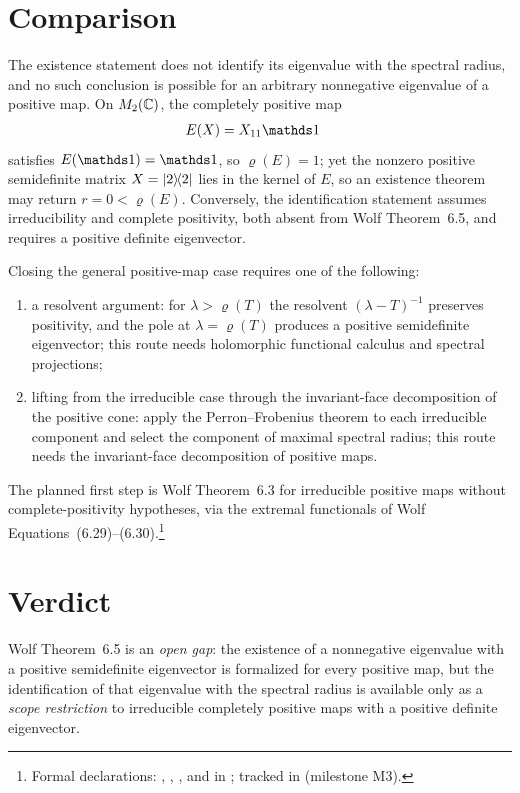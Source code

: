 \documentclass{article}
\begin{document}
\section{Comparison}

The existence statement does not identify its eigenvalue with the spectral
radius, and no such conclusion is possible for an arbitrary nonnegative
eigenvalue of a positive map. On $M_{2}(\mathbb{C})$, the completely positive map
\begin{align}
  E(X)&=X_{11} \one
\end{align}
satisfies $E(\one)=\one$, so $\varrho(E)=1$; yet the nonzero positive
semidefinite matrix $X=|2\rangle\!\langle 2|$ lies in the kernel of $E$, so an
existence theorem may return $r=0<\varrho(E)$. Conversely, the
identification statement assumes irreducibility and complete positivity, both
absent from Wolf Theorem~6.5, and requires a positive definite eigenvector.

Closing the general positive-map case requires one of the following:
\begin{enumerate}
\item a resolvent argument: for $\lambda>\varrho(T)$ the resolvent
  $(\lambda-T)^{-1}$ preserves positivity, and the pole at
  $\lambda=\varrho(T)$ produces a positive semidefinite eigenvector; this
  route needs holomorphic functional calculus and spectral projections;
\item lifting from the irreducible case through the invariant-face
  decomposition of the positive cone: apply the Perron--Frobenius theorem to
  each irreducible component and select the component of maximal spectral
  radius; this route needs the invariant-face decomposition of positive maps.
\end{enumerate}

The planned first step is Wolf Theorem~6.3 for irreducible positive maps
without complete-positivity hypotheses, via the extremal functionals of Wolf
Equations~(6.29)--(6.30).\footnote{Formal declarations:
  ,
  ,
  , and
   in
  ; tracked in
   (milestone M3).}

\section{Verdict}

Wolf Theorem~6.5 is an \emph{open gap}: the existence of a nonnegative
eigenvalue with a positive semidefinite eigenvector is formalized for every
positive map, but the identification of that eigenvalue with the spectral
radius is available only as a \emph{scope restriction} to irreducible
completely positive maps with a positive definite eigenvector.



\end{document}
